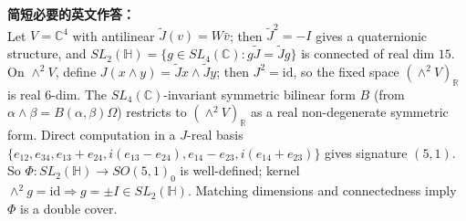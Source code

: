 \documentclass{ctexart}
\begin{document}
\vspace{1em}
\textbf{简短必要的英文作答：}\\
Let $V=\mathbb{C}^4$ with antilinear $\tilde{J}(v)=W\bar v$; then $\tilde{J}^2=-I$ gives a quaternionic structure, and $SL_2(\mathbb{H})=\{g\in SL_4(\mathbb{C}):g\tilde{J}=\tilde{J}g\}$ is connected of real dim $15$. On $\wedge^2 V$, define $J(x\wedge y)=\tilde{J}x\wedge\tilde{J}y$; then $J^2=\mathrm{id}$, so the fixed space $(\wedge^2 V)_{\mathbb{R}}$ is real $6$-dim. The $SL_4(\mathbb{C})$-invariant symmetric bilinear form $B$ (from $\alpha\wedge\beta=B(\alpha,\beta)\Omega$) restricts to $(\wedge^2 V)_{\mathbb{R}}$ as a real non-degenerate symmetric form. Direct computation in a $J$-real basis $\{e_{12},e_{34},e_{13}+e_{24},i(e_{13}-e_{24}),e_{14}-e_{23},i(e_{14}+e_{23})\}$ gives signature $(5,1)$. So $\Phi:SL_2(\mathbb{H})\to SO(5,1)_0$ is well-defined; kernel $\wedge^2 g=\mathrm{id}\Rightarrow g=\pm I\in SL_2(\mathbb{H})$. Matching dimensions and connectedness imply $\Phi$ is a double cover.
\end{document}

